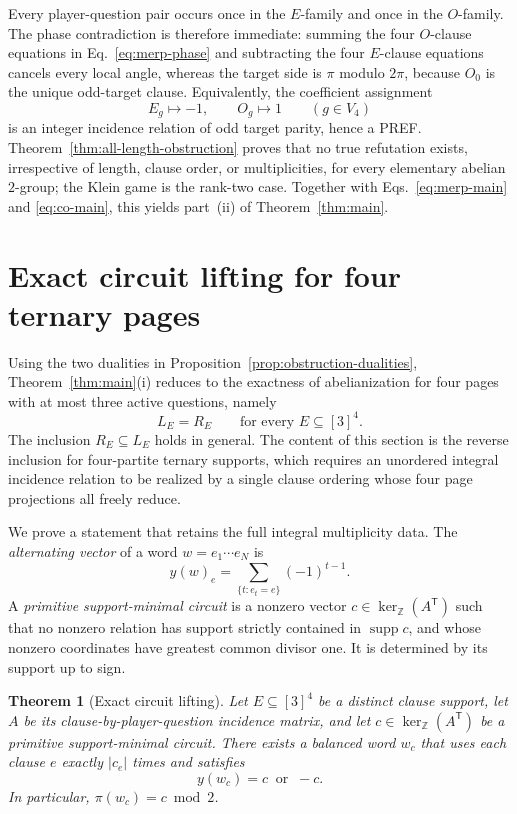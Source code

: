 \documentclass[11pt]{article}
\newtheorem{theorem}{Theorem}[section]
\theoremstyle{definition}
\theoremstyle{remark}
\newcommand{\supp}{\operatorname{supp}}
\numberwithin{equation}{section}
\begin{document}
Every player-question pair occurs once in the \(E\)-family and once in the
\(O\)-family.  The phase contradiction is therefore immediate: summing the
four \(O\)-clause equations in Eq.~\eqref{eq:merp-phase} and subtracting the
four \(E\)-clause equations cancels every local angle, whereas the target
side is \(\pi\) modulo \(2\pi\), because \(O_0\) is the unique odd-target
clause.  Equivalently, the coefficient assignment
\begin{equation}\label{eq:cayley-pref}
  E_g\longmapsto-1,\qquad O_g\longmapsto1\qquad(g\in V_4)
\end{equation}
is an integer incidence relation of odd target parity, hence a PREF.
Theorem~\ref{thm:all-length-obstruction} proves that no true refutation
exists, irrespective of length, clause order, or multiplicities, for every
elementary abelian \(2\)-group; the Klein game is the rank-two case.  Together
with Eqs.~\eqref{eq:merp-main} and \eqref{eq:co-main}, this yields part~(ii)
of Theorem~\ref{thm:main}.

\section{Exact circuit lifting for four ternary pages}
\label{sec:sufficiency}

Using the two dualities in Proposition~\ref{prop:obstruction-dualities},
Theorem~\ref{thm:main}(i) reduces to the exactness of abelianization for four
pages with at most three active questions, namely
\begin{equation}\label{eq:central-target}
  L_E=R_E
  \qquad\text{for every }E\subseteq[3]^4.
\end{equation}
The inclusion \(R_E\subseteq L_E\) holds in general.  The content of this
section is the reverse inclusion for four-partite ternary supports, which
requires an unordered integral incidence relation to be realized by a single
clause ordering whose four page projections all freely reduce.

We prove a statement that retains the full integral multiplicity data.  The
\emph{alternating vector} of a word \(w=e_1\cdots e_N\) is
\[
  y(w)_e=\sum_{\{t:e_t=e\}}(-1)^{t-1}.
\]
A \emph{primitive support-minimal circuit} is a nonzero vector
\(c\in\ker_{\mathbb Z}(A^{\mathsf T})\) such that no nonzero relation has
support strictly contained in \(\supp c\), and whose nonzero coordinates have
greatest common divisor one.  It is determined by its support up to sign.

\begin{theorem}[Exact circuit lifting]\label{thm:exact-circuit-lifting}
Let \(E\subseteq[3]^4\) be a distinct clause support, let \(A\) be its
clause-by-player-question incidence matrix, and let
\(c\in\ker_{\mathbb Z}(A^{\mathsf T})\) be a primitive support-minimal
circuit.  There exists a balanced word \(w_c\) that uses each clause \(e\)
exactly \(\lvert c_e\rvert\) times and satisfies
\begin{equation}\label{eq:exact-circuit-lift}
  y(w_c)=c\ \text{ or }\ -c.
\end{equation}
In particular, \(\pi(w_c)=c\bmod2\).
\end{theorem}
\end{document}
